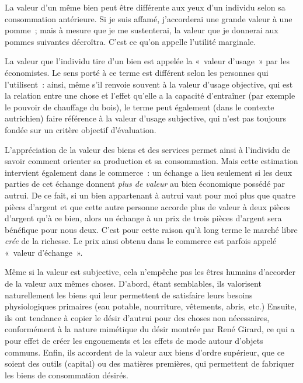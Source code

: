 La valeur d'un même bien peut être différente aux yeux d'un individu selon sa consommation antérieure. Si je suis affamé, j'accorderai une grande valeur à une pomme~; mais à mesure que je me sustenterai, la valeur que je donnerai aux pommes suivantes décroîtra. C'est ce qu'on appelle l'utilité marginale.

La valeur que l'individu tire d'un bien est appelée la «~valeur d'usage~» par les économistes. Le sens porté à ce terme est différent selon les personnes qui l'utilisent~: ainsi, même s'il renvoie souvent à la valeur d'usage objective, qui est la relation entre une chose et l'effet qu'elle a la capacité d'entraîner (par exemple le pouvoir de chauffage du bois), le terme peut également (dans le contexte autrichien) faire référence à la valeur d'usage subjective, qui n'est pas toujours fondée sur un critère objectif d'évaluation.

L'appréciation de la valeur des biens et des services permet ainsi à l'individu de savoir comment orienter sa production et sa consommation. Mais cette estimation intervient également dans le commerce~: un échange a lieu seulement si les deux parties de cet échange donnent \emph{plus de valeur} au bien économique possédé par autrui. De ce fait, si un bien appartenant à autrui vaut pour moi plus que quatre pièces d'argent et que cette autre personne accorde plus de valeur à deux pièces d'argent qu'à ce bien, alors un échange à un prix de trois pièces d'argent sera bénéfique pour nous deux. C'est pour cette raison qu'à long terme le marché libre \emph{crée} de la richesse. Le prix ainsi obtenu dans le commerce est parfois appelé «~valeur d'échange~».

Même si la valeur est subjective, cela n'empêche pas les êtres humains d'accorder de la valeur aux mêmes choses. D'abord, étant semblables, ils valorisent naturellement les biens qui leur permettent de satisfaire leurs besoins physiologiques primaires (eau potable, nourriture, vêtements, abris, etc.) Ensuite, ils ont tendance à copier le désir d'autrui pour des choses non nécessaires, conformément à la nature mimétique du désir montrée par René Girard, ce qui a pour effet de créer les engouements et les effets de mode autour d'objets communs. Enfin, ils accordent de la valeur aux biens d'ordre supérieur, que ce soient des outils (capital) ou des matières premières, qui permettent de fabriquer les biens de consommation désirés.


